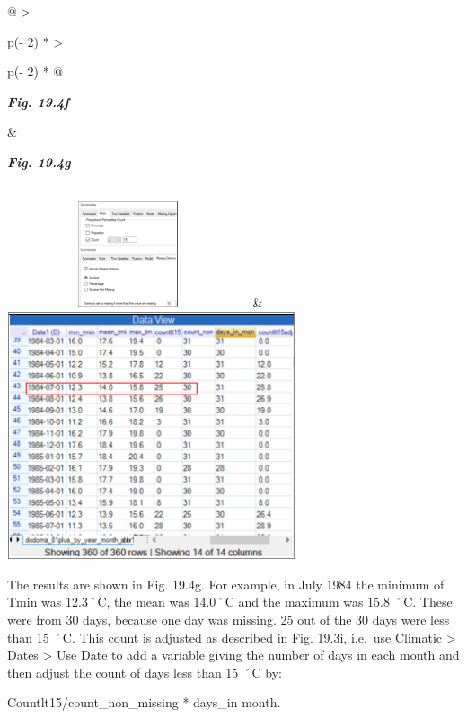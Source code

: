 \documentclass[
  letterpaper,
  DIV=11,
  numbers=noendperiod]{scrreprt}
\begin{document}
\begin{longtable}[]{@{}
  >{\raggedright\arraybackslash}p{(\columnwidth - 2\tabcolsep) * }
  >{\raggedright\arraybackslash}p{(\columnwidth - 2\tabcolsep) * }@{}}
\toprule\noalign{}
\begin{minipage}[b]{\linewidth}\raggedright
\textbf{\emph{Fig. 19.4f}}
\end{minipage} & \begin{minipage}[b]{\linewidth}\raggedright
\textbf{\emph{Fig. 19.4g}}
\end{minipage} \\
\midrule\noalign{}
\endhead
\bottomrule\noalign{}
\endlastfoot
\includegraphics[width=2.79883in,height=1.23229in]{figures/Fig19.4f.png}
&
\includegraphics[width=3.3478in,height=2.8663in]{figures/Fig19.4g.png} \\
\end{longtable}

The results are shown in Fig. 19.4g. For example, in July 1984 the
minimum of Tmin was 12.3˚C, the mean was 14.0˚C and the maximum was 15.8
˚C. These were from 30 days, because one day was missing. 25 out of the
30 days were less than 15 ˚C. This count is adjusted as described in
Fig. 19.3i, i.e.~use Climatic \textgreater{} Dates \textgreater{} Use
Date to add a variable giving the number of days in each month and then
adjust the count of days less than 15 ˚C by:

Countlt15/count\_non\_missing * days\_in month.
\end{document}
